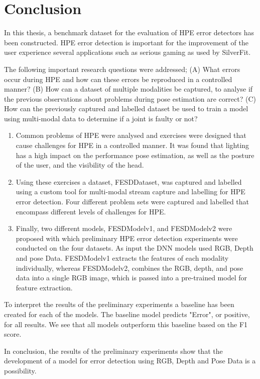 \chapter{Conclusion}
\label{sec:conclusion}

In this thesis, a benchmark dataset for the evaluation of HPE error detectors has been constructed. HPE error detection is important for the improvement of the user experience several applications such as serious gaming as used by SilverFit.

The following important research questions were addressed; (A) What errors occur during HPE and how can these errors be reproduced in a controlled manner? (B) How can a dataset of multiple modalities be captured, to analyse if the previous observations about problems during pose estimation are correct? (C) How can the previously captured and labelled dataset be used to train a model using multi-modal data to determine if a joint is faulty or not? 

\begin{enumerate}[label=\Alph*]
  \item Common problems of HPE were analysed and exercises were designed that cause challenges for HPE in a controlled manner. It was found that lighting has a high impact on the performance pose estimation, as well as the posture of the user, and the visibility of the head.
  \item Using these exercises a dataset, FESDDataset, was captured and labelled using a custom tool for multi-modal stream capture and labelling for HPE error detection. Four different problem sets were captured and labelled that encompass different levels of challenges for HPE.
  \item Finally, two different models, FESDModelv1, and FESDModelv2 were proposed with which preliminary HPE error detection experiments were conducted on the four datasets. As input the DNN models used RGB, Depth and pose Data. FESDModelv1 extracts the features of each modality individually, whereas FESDModelv2, combines the RGB, depth, and pose data into a single RGB image, which is passed into a pre-trained model for feature extraction.
\end{enumerate}

To interpret the results of the preliminary experiments a baseline has been created for each of the models. The baseline model predicts "Error", or positive, for all results. We see that all models outperform this baseline based on the F1 score.

In conclusion, the results of the preliminary experiments show that the development of a model for error detection using RGB, Depth and Pose Data is a possibility.


